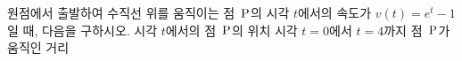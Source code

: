 \hspace*{2mm}\begin{minipage}[t]{\dimexpr\linewidth-2mm\relax}\vspace{0pt}
원점에서 출발하여 수직선 위를 움직이는 점~$\mathrm{P}$의 시각 $t$에서의 속도가 $v(t)=e^t-1$일 때, 다음을 구하시오.
 시각 $t$에서의 점~$\mathrm{P}$의 위치
 시각 $t=0$에서 $t=4$까지 점~$\mathrm{P}$가 움직인 거리\end{minipage}
